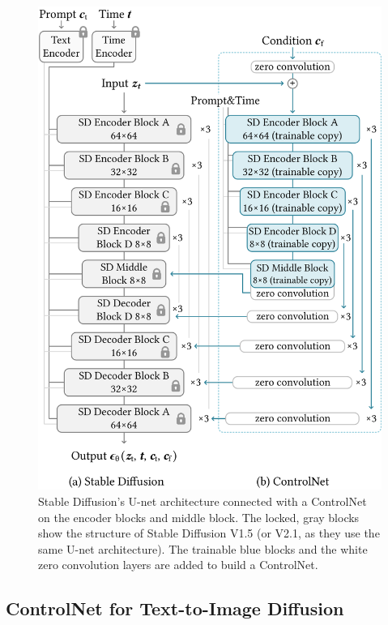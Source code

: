 \documentclass[10pt,twocolumn,letterpaper]{article}
\begin{document}
	\begin{figure}
		\includegraphics[width=\linewidth]{./imgs/sd.pdf}
		\vspace{-17pt}
		\caption{Stable Diffusion's U-net architecture connected with a ControlNet on the encoder blocks and middle block. The locked, gray blocks
			show the structure of Stable Diffusion V1.5 (or V2.1, as they use the same U-net architecture). The trainable blue blocks and the white zero convolution layers are added to build a ControlNet.}
		\vspace{-7pt}
		\label{fig:hesd} 
	\end{figure}
	
	\subsection{ControlNet for Text-to-Image Diffusion}
	\label{sec:controldiff}
	
\end{document}
